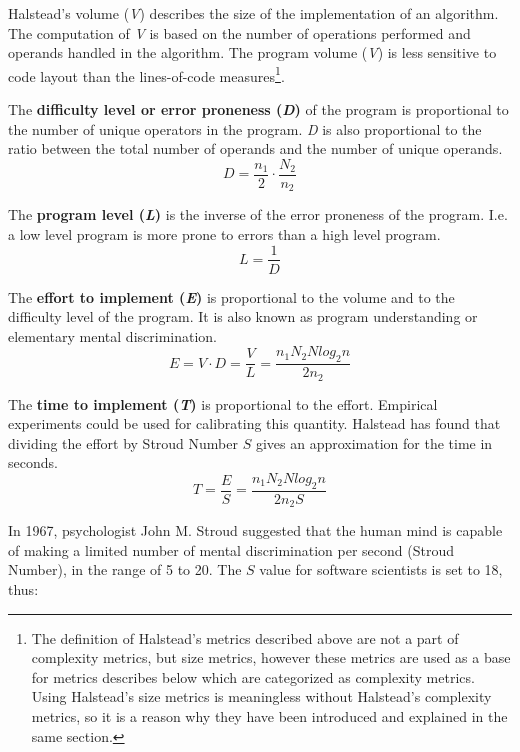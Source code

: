 Halstead's volume (\textit{V}) describes the size of the implementation of an algorithm. The computation of \textit{V} is based on the number of operations performed and operands handled in the algorithm. The program volume (\textit{V}) is less sensitive to code layout than the lines-of-code measures\footnote{The definition of Halstead's metrics described above are not a part of complexity metrics, but size metrics, however these metrics are used as a base for metrics describes below which are categorized as complexity metrics. Using Halstead's size metrics is meaningless without Halstead's complexity metrics, so it is a reason why they have been introduced and explained in the same section.}. 

The \textbf{difficulty level or error proneness (\textit{D})} of the program is proportional to the number of unique operators in the program. \textit{D} is also proportional to the ratio between the total number of operands and the number of unique operands. 
\begin{equation}
D=\frac { { n }_{ 1 } }{ 2 } \cdot \frac { { N }_{ 2 } }{ { n }_{ 2 } } 
\end{equation}
        
The \textbf{program level (\textit{L})} is the inverse of the error proneness of the program. I.e. a low level program is more prone to errors than a high level program.
\begin{equation}
L=\frac { 1 }{ D } 
\end{equation}
        
The \textbf{effort to implement (\textit{E})} is proportional to the volume and to the difficulty level of the program. It is also known as program understanding or elementary mental discrimination.
\begin{equation}
E=V\cdot D=\frac { V }{ L } =\frac { { n }_{ 1 }{ N }_{ 2 }{ Nlog_{ 2 }{ n } } }{ 2{ n }_{ 2 } } 
\end{equation}

The \textbf{time to implement (\textit{T})} is proportional to the effort. Empirical experiments could be used for calibrating this quantity. Halstead has found that dividing the effort by Stroud Number $S$ gives an approximation for the time in seconds.
\begin{equation}
T=\frac { E }{ S } =\frac { { n }_{ 1 }{ N }_{ 2 }{ Nlog_{ 2 }{ n } } }{ 2{ n }_{ 2 }S } 
\end{equation}

In 1967, psychologist John M. Stroud suggested that the human mind is capable of making a limited
number of mental discrimination per second (Stroud Number), in the range of 5 to 20. The $S$ value for software scientists is set to 18, thus: 

